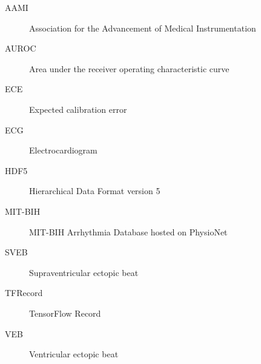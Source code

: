 \begin{description}
  \item[AAMI] Association for the Advancement of Medical Instrumentation
  \item[AUROC] Area under the receiver operating characteristic curve
  \item[ECE] Expected calibration error
  \item[ECG] Electrocardiogram
  \item[HDF5] Hierarchical Data Format version 5
  \item[MIT-BIH] MIT-BIH Arrhythmia Database hosted on PhysioNet
  \item[SVEB] Supraventricular ectopic beat
  \item[TFRecord] TensorFlow Record
  \item[VEB] Ventricular ectopic beat
\end{description}

